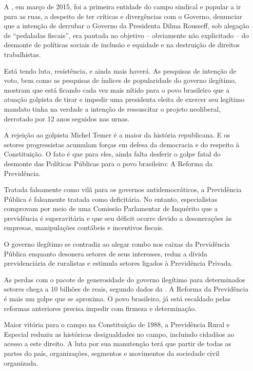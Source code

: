A , em março de 2015, foi a primeira entidade do campo sindical e
popular a ir para as ruas, a despeito de ter críticas e divergências com
o Governo, denunciar que a intenção de derrubar o Governo da Presidenta
Dilma Rousseff, sob alegação de ``pedaladas fiscais'', era pautada no
objetivo -- obviamente não explicitado -- do desmonte de políticas
sociais de inclusão e equidade e na destruição de direitos trabalhistas.

Está tendo luta, resistência, e ainda mais haverá. As pesquisas de
intenção de voto, bem como as pesquisas de índices de popularidade do
governo ilegítimo, mostram que está ficando cada vez mais nítido para o
povo brasileiro que a atuação golpista de tirar e impedir uma presidenta
eleita de exercer seu legítimo mandato tinha na verdade a intenção de
ressuscitar o projeto neoliberal, derrotado por 12 anos seguidos nas
urnas.

A rejeição ao golpista Michel Temer é a maior da história republicana. E
os setores progressistas acumulam forças em defesa da democracia e do
respeito à Constituição. O fato é que para eles, ainda falta desferir o
golpe fatal do desmonte das Políticas Públicas para o povo brasileiro: A
Reforma da Previdência.

Tratada falsamente como vilã para os governos antidemocráticos, a
Previdência Pública é falsamente tratada como deficitária. No entanto,
especialistas comprovam por meio de uma Comissão Parlamentar de
Inquérito que a previdência é superavitária e que seu déficit ocorre
devido a desonerações às empresas, manipulações contábeis e incentivos
fiscais.

O governo ilegítimo se contradiz ao alegar rombo nos caixas da
Previdência Pública enquanto desonera setores de seus interesses, reduz
a dívida previdenciária de ruralistas e estimula setores ligados à
Previdência Privada.

As perdas com o pacote de generosidade do governo ilegítimo para
determinados setores chega a 10 bilhões de reais, segundo dados da .
A Reforma da Previdência é mais um golpe que se aproxima. O povo
brasileiro, já está escaldado pelas reformas anteriores precisa impedir
com firmeza e determinação.

Maior vitória para o campo na Constituição de 1988, a Previdência Rural
e Especial reduziu as históricas desigualdades no campo, incluindo
cidadãos ao acesso a este direito. A luta por sua manutenção terá que
partir de todas as partes do país, organizações, segmentos e movimentos
da sociedade civil organizada.

